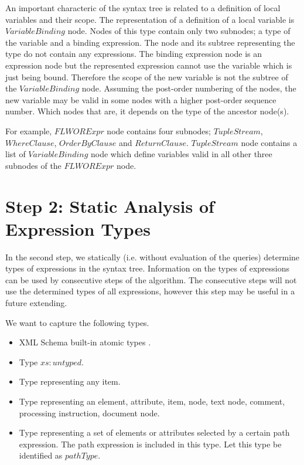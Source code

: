 
An important characteric of the syntax tree is related to a definition of local variables and their scope. The representation of a definition of a local variable is $VariableBinding$ node. Nodes of this type contain only two subnodes; a type of the variable and a binding expression. The node and its subtree representing the type do not contain any expressions. The binding expression node is an expression node but the represented expression cannot use the variable which is just being bound. Therefore the scope of the new variable is not the subtree of the $VariableBinding$ node. Assuming  the post-order numbering of the nodes, the new variable may be valid in some nodes with a higher post-order sequence number. Which  nodes that are, it depends on the type of the ancestor node(s).

For example, $FLWORExpr$ node contains four subnodes; $TupleStream$, $WhereClause$, $OrderByClause$ and $ReturnClause$. $TupleStream$ node contains a list of $VariableBinding$ node which define variables valid in all other three subnodes of the $FLWORExpr$ node.


\section{Step 2: Static Analysis of Expression Types}
In the second step, we statically (i.e. without evaluation of the queries) determine types of expressions in the syntax tree. Information on the types of expressions can be used by consecutive steps of the algorithm. The consecutive steps will not use the determined types of all expressions, however this step may be useful in a future extending.


We want to capture the following types.

\begin{itemize}
\item XML Schema built-in atomic types .
\item Type $xs:untyped$. 
\item Type representing any item. 
\item Type representing an element, attribute, item, node, text node, comment, processing instruction, document node.
\item Type representing a set of elements or attributes selected by a certain path expression. The path expression is included in this type. Let this type be identified as $pathType$.
\end{itemize}

